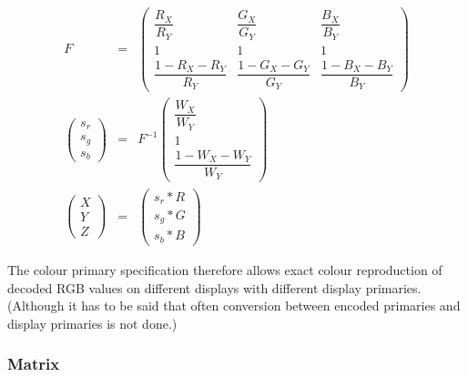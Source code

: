 \begin{informative*}
\begin{eqnarray*}
F & = &
\left(
    \begin{array}{ccc}
    \dfrac{R_X}{R_Y} & \dfrac{G_X}{G_Y} & \dfrac{B_X}{B_Y} \\
    1 & 1 & 1 \\
    \dfrac{1-R_X-R_Y}{R_Y} & \dfrac{1-G_X-G_Y}{G_Y} & \dfrac{1-B_X-B_Y}{B_Y}
    \end{array}
\right)
\\
\left(
    \begin{array}{c}
    s_r \\
    s_g \\
    s_b
    \end{array}
\right ) & = & F^{-1}
\left(
    \begin{array}{c}
    \dfrac{W_X}{W_Y} \\
    1 \\
    \dfrac{1-W_X-W_Y}{W_Y}
    \end{array}
\right) 
\\
\left(
    \begin{array}{c}
    X \\
    Y \\
    Z
    \end{array}
\right) & = & 
\left(
    \begin{array}{c}
    s_r*R \\
    s_g*G \\
    s_b*B
    \end{array}
\right)
\end{eqnarray*}

The colour primary specification therefore allows exact colour
reproduction of decoded RGB values on different displays with different
display primaries. (Although it has to be said that often conversion between
encoded primaries and display primaries is not done.)

\subsubsection{Matrix}
\label{matrix}

\end{informative*}
